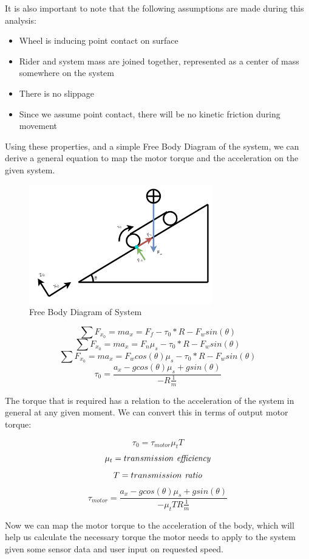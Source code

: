 \documentclass[letterpaper,12pt]{article}
\begin{document}
It is also important to note that the following assumptions are made during this analysis:
\begin{itemize}
    \item Wheel is inducing point contact on surface
    \item Rider and system mass are joined together, represented as a center of mass somewhere on the system
    \item There is no slippage
    \item Since we assume point contact, there will be no kinetic friction during movement
\end{itemize}

Using these properties, and a simple Free Body Diagram of the system, we can derive a general equation to map the motor torque and the acceleration on the given system.

\begin{figure}[h]
\caption{Free Body Diagram of System}
\includegraphics[width=8cm]{figs/FBD_MESB.png}
\centering
\end{figure}

\[\sum F _{x _{0}} = ma _x = F _f - \tau _{0} * R - F _wsin(\theta )\]
\[\sum F _{x _{0}} = ma _x = F _n \mu _s - \tau _{0} * R - F _wsin(\theta )\]
\[\sum F _{x _{0}} = ma _x = F _wcos(\theta) \mu _s - \tau _{0} * R - F _wsin(\theta )\]
\[\tau _{0} = \frac{a _x - gcos(\theta)\mu _s + gsin(\theta)}{-R \frac{1}{m}}\]

The torque that is required has a relation to the acceleration of the system in general at any given moment. We can convert this in terms of output motor torque:

\[\tau _0 = \tau _{motor}\mu_tT\]
\[\mu_t = transmission  \emph{ efficiency}\]
\[T = transmission \emph{ ratio}\]
\begin{equation} \label{eq:1}
    \tau _{motor} = \frac{a _x - gcos(\theta)\mu _s + gsin(\theta)}{-\mu_t T R \frac{1}{m}}
\end{equation}

Now we can map the motor torque to the acceleration of the body, which will help us calculate the necessary torque the motor needs to apply to the system given some sensor data and user input on requested speed.
\end{document}
